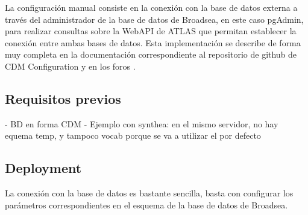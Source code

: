 La configuración manual consiste en la conexión con la base de datos externa a través del administrador de la base de datos de Broadsea, en este caso pgAdmin, para realizar consultas sobre la WebAPI de ATLAS que permitan establecer la conexión entre ambas bases de datos. Esta implementación se describe de forma muy completa en la documentación correspondiente al repositorio de github de CDM Configuration \cite{githubCDMConfiguration} y en los foros \cite{forumAddMSDB}\cite{forumBroadQuickStart}.

\subsection{Requisitos previos} \label{cap:04RequisitosPrevios}

- BD en forma CDM
- Ejemplo con synthea: en el mismo servidor,  no hay equema temp, y tampoco vocab porque se va a utilizar el por defecto

\subsection{Deployment}

La conexión con la base de datos es bastante sencilla, basta con configurar los parámetros correspondientes en el esquema  de la base de datos de Broadsea.

